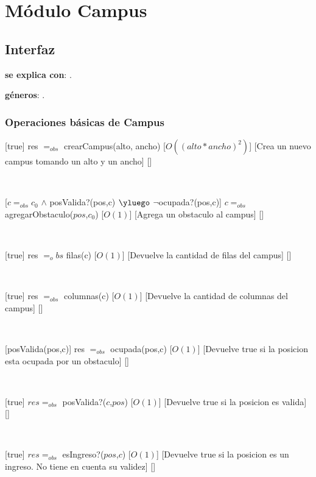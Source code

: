 \section{Módulo Campus}

\subsection{Interfaz}

\textbf{se explica con}: .

\textbf{géneros}: .

\subsubsection{Operaciones básicas de Campus}

[true]
{res $=_{obs}$ crearCampus(alto, ancho)}
[$O((alto * ancho)^2)$]
[Crea un nuevo campus tomando un alto y un ancho]
[]

~

[$c =_{obs} c_0$ $\land$ posValida?(pos,c) $\yluego$ $\neg$ocupada?(pos,c)]
{$c =_{obs}$ agregarObstaculo($pos$,$c_0$)}
[$O(1)$]
[Agrega un obstaculo al campus]
[]

~

[true]
{res $=_obs$ filas(c)}
[$O(1)$]
[Devuelve la cantidad de filas del campus]
[]

~

[true]
{res $=_{obs}$ columnas(c)}
[$O(1)$]
[Devuelve la cantidad de columnas del campus]
[]

~


[posValida(pos,c)]
{res $=_{obs}$ ocupada(pos,c)}
[$O(1)$]
[Devuelve true si la posicion esta ocupada por un obstaculo]
[]

~

[true]
{$res =_{obs}$ posValida?($c$,$pos$)}
[$O(1)$]
[Devuelve true si la posicion es valida]
[]

~

[true]
{$res =_{obs}$ esIngreso?($pos$,$c$)}
[$O(1)$]
[Devuelve true si la posicion es un ingreso. No tiene en cuenta su validez]
[]

